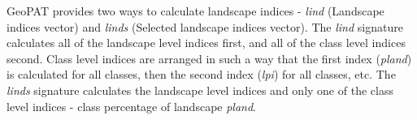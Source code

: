 GeoPAT provides two ways to calculate landscape indices - {\it lind} (Landscape indices vector) and {\it linds} (Selected landscape indices vector).
The {\it lind} signature calculates all of the landscape level indices first, and all of the class level indices second.
Class level indices are arranged in such a way that the first index ({\it pland}) is calculated for all classes, then the second index ({\it lpi}) for all classes, etc. 
The {\it linds} signature calculates the landscape level indices and only one of the class level indices - class percentage of landscape {\it pland}. 

% 
% 
% 
% 
% 
